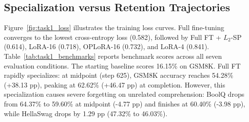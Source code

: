 \documentclass{article}
\begin{document}
\subsection{Specialization versus Retention Trajectories}
Figure~\ref{fig:task1_loss} illustrates the training loss curves. Full fine-tuning converges to the lowest cross-entropy loss (0.582), followed by Full FT + $L_2$-SP (0.614), LoRA-16 (0.718), OPLoRA-16 (0.732), and LoRA-4 (0.841). Table~\ref{tab:task1_benchmarks} reports benchmark scores across all seven evaluation conditions. The starting baseline scores 16.15\% on GSM8K. Full FT rapidly specializes: at midpoint (step 625), GSM8K accuracy reaches 54.28\% (+38.13 pp), peaking at 62.62\% (+46.47 pp) at completion. However, this specialization causes severe forgetting on unrelated comprehension: BoolQ drops from 64.37\% to 59.60\% at midpoint (-4.77 pp) and finishes at 60.40\% (-3.98 pp), while HellaSwag drops by 1.29 pp (47.32\% to 46.03\%).

\begin{table}[!htbp]
\centering
\caption{Benchmark evaluation across all seven experimental conditions. Primary scores are reported alongside changes ($\Delta$ in percentage points) relative to the unchanged starting baseline.}
\label{tab:task1_benchmarks}
\end{table}
\end{document}
